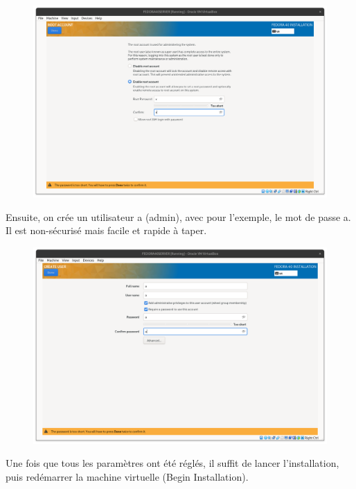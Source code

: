 \documentclass{article}
\begin{document}
\begin{figure}[h!]
		\centering
		\includegraphics[width=1\textwidth]{vbox14.png}
\end{figure}

\pagebreak

Ensuite, on crée un utilisateur a (admin), avec pour l'exemple, le mot de passe a. Il est non-sécurisé mais facile et rapide à taper.

\begin{figure}[h!]
		\centering
		\includegraphics[width=1\textwidth]{vbox15.png}
\end{figure}

Une fois que tous les paramètres ont été réglés, il suffit de lancer l'installation, puis redémarrer la machine virtuelle (Begin Installation).
\end{document}
